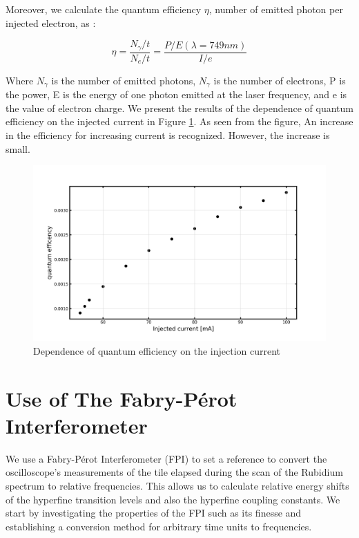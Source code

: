 \documentclass[12pt]{article}
\begin{document}
Moreover, we calculate the quantum efficiency $\eta$, number of emitted photon per injected electron, as \cite{lecturenote}:

\begin{equation}
    \eta = \frac{N_{\gamma}/t}{N_{e}/t} = \frac{P/E(\lambda = 749 nm)}{I/e}
    \label{eq1}
\end{equation}

Where $N_{\gamma}$ is the number of emitted photons, $N_{\gamma}$ is the number of electrons, P is the power, E is the energy of one photon emitted at the laser frequency, and e is the value of electron charge. We present the results of the dependence of quantum efficiency on the injected current in Figure \ref{fig3}. As seen from the figure, An increase in the efficiency for increasing current is recognized. However, the increase is small. 

\begin{figure}[H]
    \centering
    \includegraphics[width = \textwidth]{fig/Quantum_efficency.png}
    \caption{Dependence of quantum efficiency on the injection current}
    \label{fig3}
\end{figure}




\section{Use of The Fabry-Pérot Interferometer}

We use a Fabry-Pérot Interferometer (FPI) to set a reference to convert the oscilloscope's measurements of the tile elapsed during the scan of the Rubidium spectrum to relative frequencies. This allows us to calculate relative energy shifts of the hyperfine transition levels and also the hyperfine coupling constants. 
We start by investigating the properties of the FPI such as its finesse and establishing a conversion method for arbitrary time units to frequencies.   
\end{document}
